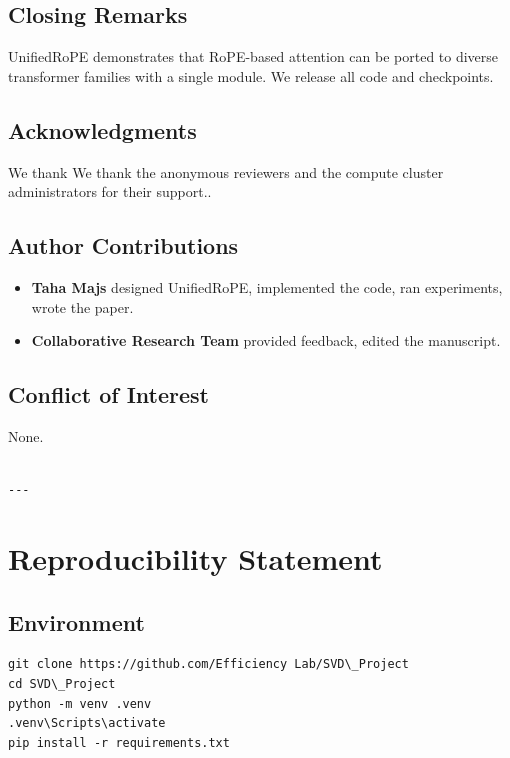 \subsection{Closing Remarks}

UnifiedRoPE demonstrates that RoPE-based attention can be ported to diverse 
transformer families with a single module. We release all code and 
checkpoints.

\subsection{Acknowledgments}

We thank We thank the anonymous reviewers and the compute cluster administrators for their support..

\subsection{Author Contributions}

\begin{itemize}
\item \textbf{Taha Majs} designed UnifiedRoPE, implemented the code, ran
  experiments, wrote the paper.
\item \textbf{Collaborative Research Team} provided feedback, edited the manuscript.

\end{itemize}
\subsection{Conflict of Interest}

None.
\begin{lstlisting}

---
\end{lstlisting}


\section{Reproducibility Statement}

\subsection{Environment}

\begin{lstlisting}
git clone https://github.com/Efficiency Lab/SVD\_Project
cd SVD\_Project
python -m venv .venv
.venv\Scripts\activate
pip install -r requirements.txt
\end{lstlisting}

